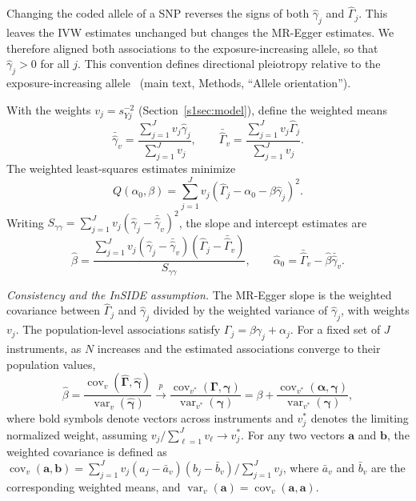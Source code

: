 \noindent Changing the coded allele of a SNP reverses the signs of both $\hat{\gamma}_j$ and $\hat{\Gamma}_j$. This leaves the IVW estimates unchanged but changes the MR-Egger estimates. We therefore aligned both associations to the exposure-increasing allele, so that $\hat{\gamma}_j>0$ for all $j$. This convention defines directional pleiotropy relative to the exposure-increasing allele~\cite{burgess2017interpreting} (main text, Methods, ``Allele orientation'').

\noindent With the weights $v_j=s_{Yj}^{-2}$ (Section~\ref{s1sec:model}), define the weighted means
\begin{equation*}
\bar{\hat{\gamma}}_v
=
\frac{\sum_{j=1}^{J}v_j\hat{\gamma}_j}
     {\sum_{j=1}^{J}v_j},
\qquad
\bar{\hat{\Gamma}}_v
=
\frac{\sum_{j=1}^{J}v_j\hat{\Gamma}_j}
     {\sum_{j=1}^{J}v_j}.
\end{equation*}
The weighted least-squares estimates minimize
\begin{equation*}
Q(\alpha_0,\beta)
=
\sum_{j=1}^{J}v_j
(\hat{\Gamma}_j-\alpha_0-\beta\hat{\gamma}_j)^2.
\end{equation*}
Writing $S_{\gamma\gamma}=\sum_{j=1}^{J}v_j(\hat{\gamma}_j-\bar{\hat{\gamma}}_v)^2$, the slope and intercept estimates are
\begin{equation*}
\hat{\beta}
=
\frac{
\sum_{j=1}^{J}v_j
(\hat{\gamma}_j-\bar{\hat{\gamma}}_v)
(\hat{\Gamma}_j-\bar{\hat{\Gamma}}_v)
}{
S_{\gamma\gamma}
},
\qquad
\hat{\alpha}_0
=
\bar{\hat{\Gamma}}_v-\hat{\beta}\bar{\hat{\gamma}}_v.
\end{equation*}

\noindent \textit{Consistency and the InSIDE assumption.} The MR-Egger slope is the weighted covariance between $\hat{\Gamma}_j$ and $\hat{\gamma}_j$ divided by the weighted variance of $\hat{\gamma}_j$, with weights $v_j$. The population-level associations satisfy $\Gamma_j=\beta\gamma_j+\alpha_j$. For a fixed set of $J$ instruments, as $N$ increases and the estimated associations converge to their population values,
\begin{equation*}
\hat{\beta}
=
\frac{\operatorname{cov}_v(\hat{\boldsymbol{\Gamma}},\hat{\boldsymbol{\gamma}})}
     {\operatorname{var}_v(\hat{\boldsymbol{\gamma}})}
\xrightarrow{p}
\frac{\operatorname{cov}_{v^*}(\boldsymbol{\Gamma},\boldsymbol{\gamma})}
     {\operatorname{var}_{v^*}(\boldsymbol{\gamma})}
=
\beta+
\frac{\operatorname{cov}_{v^*}(\boldsymbol{\alpha},\boldsymbol{\gamma})}
     {\operatorname{var}_{v^*}(\boldsymbol{\gamma})},
\end{equation*}
where bold symbols denote vectors across instruments and $v_j^*$ denotes the limiting normalized weight, assuming $v_j/\sum_{\ell=1}^{J}v_\ell\to v_j^*$. For any two vectors $\boldsymbol a$ and $\boldsymbol b$, the weighted covariance is defined as $\operatorname{cov}_v(\boldsymbol a,\boldsymbol b)=\sum_{j=1}^{J}v_j(a_j-\bar a_v)(b_j-\bar b_v)/\sum_{j=1}^{J}v_j$, where $\bar a_v$ and $\bar b_v$ are the corresponding weighted means, and $\operatorname{var}_v(\boldsymbol a)=\operatorname{cov}_v(\boldsymbol a,\boldsymbol a)$.


